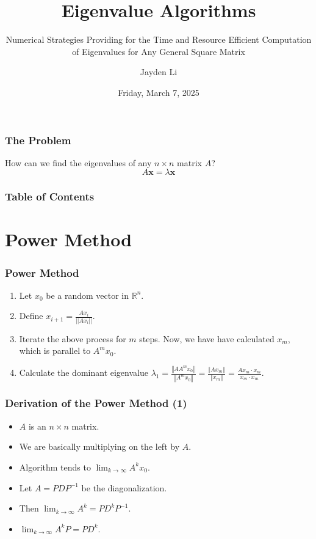 \documentclass{beamer}
\title{Eigenvalue Algorithms}
\subtitle{Numerical Strategies Providing for the Time and Resource Efficient Computation of Eigenvalues for Any General Square Matrix}
\author{Jayden Li}
\date{Friday, March 7, 2025}
\begin{document}
\frame{\titlepage}

\begin{frame}
\frametitle{The Problem}

\begin{center}
	\begin{tcolorbox}[colback=yellow!5!white,colframe=yellow!75!black,parbox=false,width=0.6\linewidth]
		\centering
		How can we find the eigenvalues of any $n\times n$ matrix $A$?
		\begin{equation*}
			A\mathbf x=\lambda\mathbf x
		\end{equation*}
	\end{tcolorbox}
\end{center}

\end{frame}

\begin{frame}
	\frametitle{Table of Contents}
	\tableofcontents
\end{frame}

\section{Power Method}
\frame{\sectionpage}

\begin{frame}
	\frametitle{Power Method}
	\begin{tcolorbox}[title={Power Method},colback=red!5!white,colframe=red!75!black,parbox=false]
		\begin{enumerate}
			\item<2-> Let $x_0$ be a random vector in $\mathbb R^n$.
			\item<3-> Define $\displaystyle x_{i+1}=\frac{Ax_i}{||Ax_i||}$.
			\item<4-> Iterate the above process for $m$ steps. Now, we have have calculated $x_m$, which is parallel to $A^m x_0$.
			\item<5-> Calculate the dominant eigenvalue $\displaystyle \lambda_1=\frac{\left\Vert A A^m x_0 \right\Vert}{\left\Vert A^m x_0 \right\Vert}=\frac{\left\Vert A x_m\right\Vert}{\left\Vert x_m \right\Vert}=\frac{Ax_m\cdot x_m}{x_m \cdot x_m}$.
		\end{enumerate}
	\end{tcolorbox}
\end{frame}

\begin{frame}
	\frametitle{Derivation of the Power Method (1)}
	\begin{itemize}
		\item<1-> $A$ is an $n\times n$ matrix.
		\item<2-> We are basically multiplying on the left by $A$.
		\item<3-> Algorithm tends to $\displaystyle \lim_{k\to\infty}A^k x_0$.
		\item<4-> Let $A=PDP^{-1}$ be the diagonalization.
		\item<4-> Then $\displaystyle \lim_{k\to\infty}A^k=PD^kP^{-1}$.
		\item<5-> $\displaystyle \lim_{k\to\infty}A^kP=PD^k$.
	\end{itemize}
\end{frame}
\end{document}

